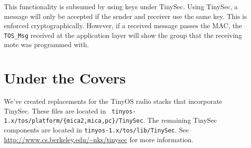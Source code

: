 \documentclass[11pt]{article}
\begin{document}
This functionality is subsumed by using keys under TinySec. Using TinySec, a
message will only be accepted if the sender and receiver use the same
key. This is enforced cryptographically. However, if a received message passes
the MAC, the {\tt TOS\_Msg} received at the application layer will show the group
that the receiving mote was programmed with.  

\section{Under the Covers}
We've created replacements for the TinyOS radio stacks that incorporate
TinySec. These files are located in {\tt
  tinyos-1.x/tos/platform/\{mica2,mica,pc\}/TinySec}. The remaining TinySec
components are located in {\tt tinyos-1.x/tos/lib/TinySec}.
See \url{http://www.cs.berkeley.edu/~nks/tinysec} for more information.
\end{document}
